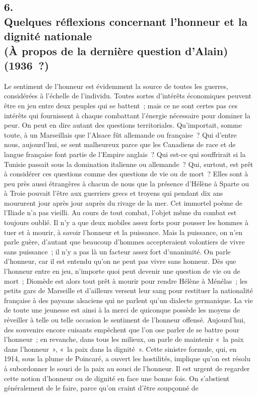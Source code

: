 \documentclass[french,twoside]{book} %
\begin{document}
\par

\begin{center}
\end{center}
\subsection[6. Quelques réflexions concernant l'honneur et la dignité nationale, (À propos de la dernière question d'Alain) (1936 ?)]{6. \\
Quelques réflexions concernant l'honneur et la dignité nationale \\
(À propos de la dernière question d'Alain) \\
(1936 ?)}
\noindent \par
Le sentiment de l'honneur est évidemment la source de toutes les guerres, considérées à l'échelle de l'individu. Toutes sortes d'intérêts économiques peuvent être en jeu entre deux peuples qui se battent ; mais ce ne sont certes pas ces intérêts qui fournissent à chaque combattant l'énergie nécessaire pour dominer la peur. On peut en dire autant des questions territoriales. Qu'impor­tait, somme toute, à un Marseillais que l'Alsace fût allemande ou française ? Qui d'entre nous, aujourd'hui, se sent malheureux parce que les Canadiens de race et de langue française font partie de l'Empire anglais ? Qui est-ce qui souffrirait si la Tunisie passait sous la domination italienne ou allemande ? Qui, surtout, est prêt à considérer ces questions comme des questions de vie ou de mort ? Elles sont à peu près aussi étrangères à chacun de nous que la présence d'Hélène à Sparte ou à Troie pouvait l'être aux guerriers grecs et troyens qui pendant dix ans moururent jour après jour auprès du rivage de la mer. Cet immortel poème de l'Iliade n'a pas vieilli. Au cours de tout combat, l'objet même du combat est toujours oublié. Il n'y a que deux mobiles assez forts pour pousser les hommes à tuer et à mourir, à savoir l'honneur et la puissance. Mais la puissance, on n'en parle guère, d'autant que beaucoup d'hommes accepteraient volontiers de vivre sans puissance ; il n'y a pas là un facteur assez fort d'unanimité. On parle d'honneur, car il est entendu qu'on ne peut pas vivre sans honneur. Dès que l'honneur entre en jeu, n'importe quoi peut devenir une question de vie ou de mort ; Diomède est alors tout prêt à mourir pour rendre Hélène à Ménélas ; les petits gars de Marseille et d'ailleurs versent leur sang pour restituer la nationalité française à des paysans alsaciens qui ne parlent qu'un dialecte germanique. La vie de toute une jeunesse est ainsi à la merci de quiconque possède les moyens de réveiller à telle ou telle occasion le sentiment de l'honneur offensé. Aujourd'hui, des souvenirs encore cuisants empêchent que l'on ose parler de se battre pour l'honneur ; en revanche, dans tous les milieux, on parle de maintenir « la paix dans l'honneur », « la paix dans la dignité ». Cette sinistre formule, qui, en 1914, sous la plume de Poincaré, a ouvert les hostilités, implique qu'on est résolu à subordonner le souci de la paix au souci de l'honneur. Il est urgent de regarder cette notion d'honneur ou de dignité en face une bonne fois. On s'abstient généralement de le faire, parce qu'on craint d'être soupçonné de 
\end{document}
